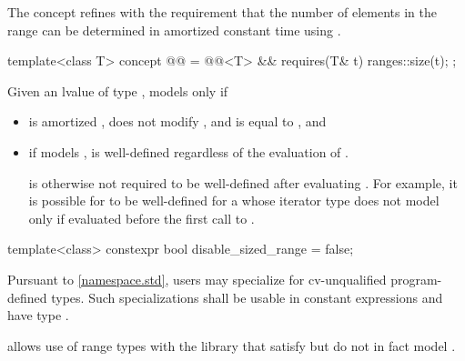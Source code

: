 \pnum
The  concept refines  with
the requirement that the number of elements in the range can be determined
in amortized constant time using .

\begin{itemdecl}
template<class T>
  concept @@ =
    @@<T> && requires(T& t) { ranges::size(t); };
\end{itemdecl}

\begin{itemdescr}
\pnum
Given an lvalue  of type , 
models  only if
\begin{itemize}
\item {} is amortized , does not modify ,
and is equal to , and

\item if  models ,
 is well-defined regardless of the evaluation of
.
\begin{note}
 is otherwise not required to be
well-defined after evaluating .
For example, it is possible for  to be well-defined
for a  whose iterator type
does not model 
only if evaluated before the first call to .
\end{note}
\end{itemize}
\end{itemdescr}

%
\begin{itemdecl}
template<class>
  constexpr bool disable_sized_range = false;
\end{itemdecl}

\begin{itemdescr}
\pnum
\remarks
Pursuant to \ref{namespace.std},
users may specialize 
for cv-unqualified program-defined types.
Such specializations shall
be usable in constant expressions and
have type .

\pnum
\begin{note}
 allows use of range types with the library
that satisfy but do not in fact model .
\end{note}
\end{itemdescr}

